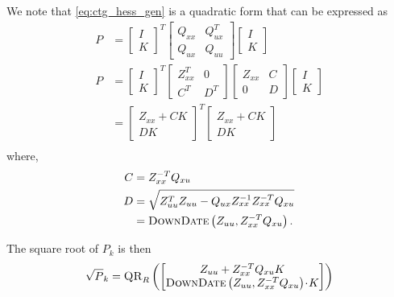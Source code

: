 \documentclass[../root.tex]{subfiles}
\begin{document}
We note that \eqref{eq:ctg_hess_gen} is a quadratic form that can be expressed as
\begin{equation}
\begin{aligned}
    P &= \begin{bmatrix} I \\ K \end{bmatrix}^T 
          \begin{bmatrix} Q_{xx} & Q_{ux}^T \\ Q_{ux} & Q_{uu} \end{bmatrix}
          \begin{bmatrix} I \\ K \end{bmatrix} \\
    P &= \begin{bmatrix} I \\ K \end{bmatrix}^T 
      \begin{bmatrix} Z_{xx}^T & 0\\ C^T & D^T \end{bmatrix}\begin{bmatrix} Z_{xx} & C \\ 0 & D \end{bmatrix}
      \begin{bmatrix} I \\ K \end{bmatrix} \\
      &= \begin{bmatrix} Z_{xx} + C K \\ D K \end{bmatrix}^T 
         \begin{bmatrix} Z_{xx} + C K \\ D K \end{bmatrix} \\
\end{aligned}
\end{equation}
where,
\begin{align}
    C &= Z_{xx}^{-T} Q_{xu} \\
    D &= \sqrt{Z_{uu}^T Z_{uu} - Q_{ux} Z_{xx}^{-1} Z_{xx}^{-T} Q_{xu}} \\
      &= \textproc{DownDate}\left(Z_{uu}, Z_{xx}^{-T} Q_{xu} \right).
\end{align}

The square root of $P_k$ is then
\begin{equation}
    \sqrt{P}_k = \textproc{QR}_R \left( \begin{bmatrix} Z_{uu} + Z_{xx}^{-T} Q_{xu} K \\
    \textproc{DownDate}\left(Z_{uu}, Z_{xx}^{-T} Q_{xu} \right) \! \cdot \! K \end{bmatrix} \right)
\end{equation}
\end{document}
